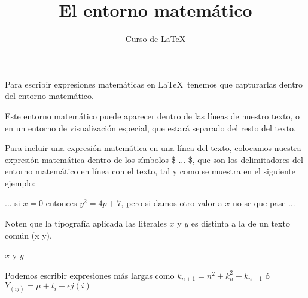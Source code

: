 \documentclass[10pt,letterpaper]{article}
\title{El entorno matemático}
\author{Curso de \LaTeX}
\begin{document}
\maketitle

Para escribir expresiones matemáticas en \LaTeX\ tenemos que capturarlas dentro del entorno matemático.

Este entorno matemático puede aparecer dentro de las líneas de nuestro texto, o en un entorno de visualización especial, que estará separado del resto del texto. 

Para incluir una expresión matemática en una línea del texto, colocamos nuestra expresión matemática dentro de los símbolos \$ ... \$, que son los delimitadores del entorno matemático en línea con el texto, tal y como se muestra en el siguiente ejemplo:

... si $x=0$ entonces $y^2 = 4p+7$, pero si damos otro valor a $x$ no se que pase ... 

Noten que la tipografía aplicada las literales $x$ y $y$ es distinta a la de un texto común (x y).


\(x\) y \(y\)

Podemos escribir expresiones más largas como $k_{n+1}=n^2 + k_n^2 - k_{n-1}$ ó $Y_{(ij)} = \mu + t_i + \epsilon  j (i) $
\end{document}
